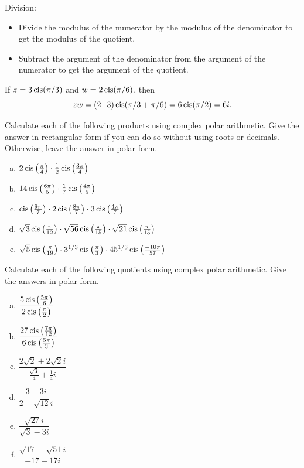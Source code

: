 {\medskip{}
\noindent
Division:
\begin{itemize}
\item
Divide the modulus of the numerator by the modulus of the denominator to get the modulus of the quotient.
\item
Subtract the argument of the denominator from the argument of the numerator to get the argument of the quotient.
\end{itemize}

\begin{example}\label{example:complex:polarmult} If $z=3\operatorname{cis}(\pi/3)$ and $w=2\operatorname{cis}(\pi/6)$,
then $$zw=(2\cdot3)\operatorname{cis}(\pi/3 + \pi/6)= 6 \operatorname{cis}(\pi/2)=6i.$$ \end{example}

\begin{exercise}\label{exercise:complex:25}
Calculate each of the following products using complex polar arithmetic. Give the answer in rectangular form if you can do so without using roots or decimals. Otherwise, leave the answer in polar form.
\begin{enumerate}[(a)]
 
 \item
$2\operatorname{cis}\left(\frac{\pi}{4}\right) \cdot \frac{1}{2} \operatorname{cis}\left( \frac{3\pi}{4}\right)$
 \item
$14\operatorname{cis}\left( \frac{6\pi}{5}\right) \cdot \frac{1}{7} \operatorname{cis}\left( \frac{4\pi}{5} \right) $
\item
$\operatorname{cis}\left(\frac{9\pi}{7}\right) \cdot 2 \operatorname{cis}\left( \frac{8\pi}{7}\right) \cdot 3 \operatorname{cis}\left( \frac{4\pi}{7}\right)$
\item
$\sqrt{3}\operatorname{cis}\left(\frac{\pi}{12}\right)\cdot \sqrt{56}\operatorname{cis}\left(\frac{\pi}{15}\right)\cdot \sqrt{21}\operatorname{cis}\left(\frac{\pi}{15}\right)$
\item
$\sqrt{5}\operatorname{cis}\left(\frac{\pi}{19}\right)\cdot 3^{1/3} \operatorname{cis}\left(\frac{\pi}{3}\right)\cdot 45^{1/3}\operatorname{cis}\left(\frac{-10\pi}{57}\right)$
\end{enumerate}
\end{exercise}

\begin{exercise}\label{exercise:complex:26}
Calculate each of the following quotients using complex polar arithmetic. Give the answers in polar form.
\begin{multicols}{2}
\begin{enumerate}[(a)]
\item
$\dfrac{5\operatorname{cis}\left( \frac{5\pi}{6}\right)}{2\operatorname{cis} \left( \frac{\pi}{2}\right)}$
\item
$\dfrac{27\operatorname{cis}\left(\frac{7\pi}{12}\right)}{6\operatorname{cis}\left(\frac{5\pi}{3}\right)}$
\item
$\dfrac{2\sqrt{2} + 2\sqrt{2}i}{\frac{\sqrt{3}}{4} + \frac{1}{4}i}$
\item
$\dfrac{3 - 3i}{2 - \sqrt{12}i}$
\item
$\dfrac{\sqrt{27} i}{\sqrt{3} - 3i}$
\item
$\dfrac{\sqrt{17} - \sqrt{51} i}{-17 - 17i}$
 

\end{enumerate}
\end{multicols}
\end{exercise}}
